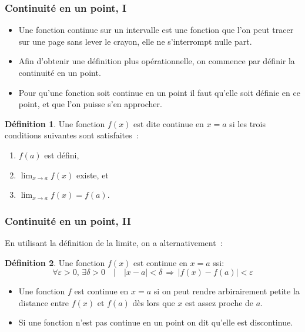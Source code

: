 \documentclass[10pt,notheorems]{beamer}
\theoremstyle{plain}
\theoremstyle{definition} %
\newtheorem{definition}{Définition}
\begin{document}
\begin{frame}
  \frametitle{Continuité en un point, I}

  \begin{itemize}

  \item Une fonction continue sur un intervalle est une fonction que l'on peut tracer sur une page sans lever le crayon, elle ne s'interrompt nulle part.\newline

  \item Afin d'obtenir une définition plus opérationnelle, on commence par définir la continuité en un point.\newline

  \item Pour qu'une fonction soit continue en un point il faut qu'elle soit définie en ce point, et que l'on puisse s'en approcher.\newline

  \end{itemize}

  \begin{definition}
    Une fonction $f(x)$ est dite continue en $x=a$ si les trois conditions suivantes sont satisfaites~:
    \begin{enumerate}
    \item $f(a)$ est défini,
    \item $\lim_{x\rightarrow a}f(x)$ existe, et
    \item $\lim_{x\rightarrow a}f(x) = f(a)$.
    \end{enumerate}
  \end{definition}

\end{frame}


\begin{frame}
  \frametitle{Continuité en un point, II}

  En utilisant la définition de la limite, on a alternativement~:\newline

  \begin{definition}
    Une fonction $f(x)$ est continue en $x=a$ ssi:
    \[
      \forall \varepsilon>0,\, \exists \delta>0\quad |\quad |x-a|<\delta\, \Rightarrow\, |f(x)-f(a)|<\varepsilon
    \]
  \end{definition}

  \bigskip

  \begin{itemize}

  \item Une fonction $f$ est continue en $x=a$ si on peut rendre arbirairement petite la distance entre $f(x)$ et $f(a)$ dès lors que $x$ est assez proche de $a$.\newline

  \item Si une fonction n'est pas continue en un point on dit qu'elle  est discontinue.

  \end{itemize}

\end{frame}
\end{document}

